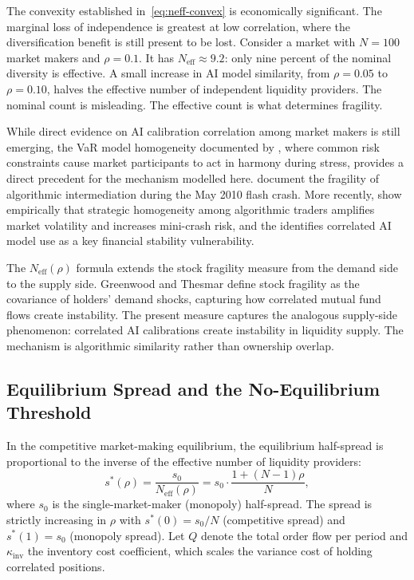 The convexity established in~\eqref{eq:neff-convex} is economically significant. The marginal loss of independence is greatest at low correlation, where the diversification benefit is still present to be lost. Consider a market with $N = 100$ market makers and $\rho = 0.1$. It has $N_{\text{eff}} \approx 9.2$: only nine percent of the nominal diversity is effective. A small increase in AI model similarity, from $\rho = 0.05$ to $\rho = 0.10$, halves the effective number of independent liquidity providers. The nominal count is misleading. The effective count is what determines fragility.

While direct evidence on AI calibration correlation among market makers is still emerging, the VaR model homogeneity documented by \citet{danielsson2012}, where common risk constraints cause market participants to act in harmony during stress, provides a direct precedent for the mechanism modelled here. \citet{kirilenko2017} document the fragility of algorithmic intermediation during the May 2010 flash crash. More recently, \citet{liu2025} show empirically that strategic homogeneity among algorithmic traders amplifies market volatility and increases mini-crash risk, and the \citet{fsb2024} identifies correlated AI model use as a key financial stability vulnerability.

The $N_{\text{eff}}(\rho)$ formula extends the \citet{greenwood2011} stock fragility measure from the demand side to the supply side. Greenwood and Thesmar define stock fragility as the covariance of holders' demand shocks, capturing how correlated mutual fund flows create instability. The present measure captures the analogous supply-side phenomenon: correlated AI calibrations create instability in liquidity supply. The mechanism is algorithmic similarity rather than ownership overlap.

\subsection{Equilibrium Spread and the No-Equilibrium Threshold}

In the competitive market-making equilibrium, the equilibrium half-spread is proportional to the inverse of the effective number of liquidity providers:
\begin{equation}\label{eq:spread}
  s^*(\rho) = \frac{s_0}{N_{\text{eff}}(\rho)} = s_0 \cdot \frac{1+(N-1)\rho}{N},
\end{equation}
where $s_0$ is the single-market-maker (monopoly) half-spread. The spread is strictly increasing in $\rho$ with $s^*(0) = s_0/N$ (competitive spread) and $s^*(1) = s_0$ (monopoly spread). Let $Q$ denote the total order flow per period and $\kappa_{\text{inv}}$ the inventory cost coefficient, which scales the variance cost of holding correlated positions.

